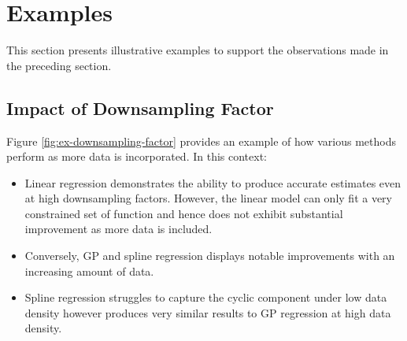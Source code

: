 %



\section{Examples}
This section presents illustrative examples to support the observations made in
the preceding section.


\subsection{Impact of Downsampling Factor}


Figure \ref{fig:ex-downsampling-factor} provides an example of how various
methods perform as more data is incorporated. In this context:

\begin{itemize}
    \item Linear regression demonstrates the ability to produce accurate estimates even
    at high downsampling factors. However, the linear model can only
    fit a very constrained set of function and hence
    does not exhibit substantial improvement as more data is included.
    \item Conversely, GP and spline regression displays notable improvements with an
    increasing amount of data.
    \item Spline regression struggles to capture the cyclic
    component under low data density however produces very similar results
    to GP regression at high data density.
\end{itemize}

